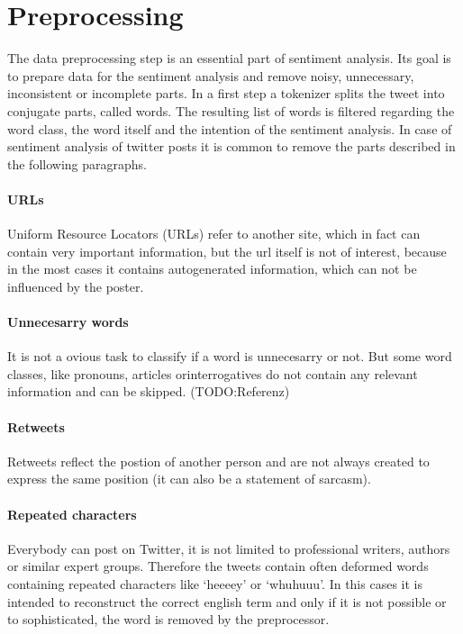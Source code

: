 \section{Preprocessing}
The data preprocessing step is an essential 
part of sentiment analysis. Its goal is to prepare data
for the sentiment analysis and remove noisy, unnecessary, 
inconsistent or incomplete parts.\autocite{Hemalatha2012}
\autocite{hemalatha2012preprocessing} In a first step a
tokenizer splits the tweet into conjugate parts, called words. 
The resulting list of words is filtered regarding the word class, 
the word itself and the intention of the sentiment analysis. 
In case of sentiment analysis of twitter posts it is common to 
remove the parts described in the following paragraphs.
\autocite{Hemalatha2012}

\paragraph{URLs}
Uniform Resource Locators (URLs) refer to another site, which 
in fact can contain very important information, but the url 
itself is not of interest, because in the most cases it 
contains autogenerated information, which can not be influenced 
by the poster.

\paragraph{Unnecesarry words}
It is not a ovious task to classify if a word is unnecesarry 
or not. But some word classes, like pronouns, articles orinterrogatives
do not contain any relevant information and can be skipped. (TODO:Referenz)

\paragraph{Retweets}
Retweets reflect the postion of another person and are not always
created to express the same position (it can also be a statement of sarcasm).

\paragraph{Repeated characters}
Everybody can post on Twitter, it is not limited 
to professional writers, authors or similar expert groups.
Therefore the tweets contain often deformed words 
containing repeated characters like `heeeey' or
`whuhuuu'. In this cases it is intended to reconstruct 
the correct english term and only if it is not 
possible or to sophisticated, the word is removed 
by the preprocessor.



